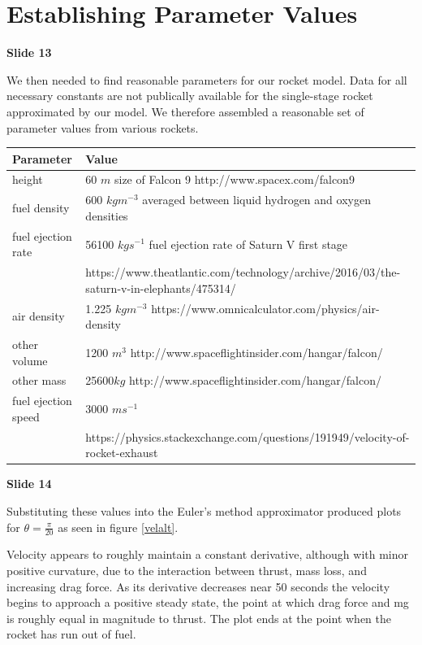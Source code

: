 \documentclass[]{article}
\begin{document}
\section{Establishing Parameter Values}

\textbf{Slide 13}

We then needed to find reasonable parameters for our rocket model. Data for all necessary constants are not publically available for the single-stage rocket approximated by our model. We therefore assembled a reasonable set of parameter values from various rockets. 

\begin{center}
	\begin{tabular} {l l} 
		Parameter & Value \\
		\hline
		height & 60 $m$ size of Falcon 9 http://www.spacex.com/falcon9\\
		fuel density & 600 $kgm^{-3}$ averaged between liquid hydrogen and oxygen densities\\
		fuel ejection rate & 56100 $kg s^{-1}$ fuel ejection rate of Saturn V first stage \\ & \small https://www.theatlantic.com/technology/archive/2016/03/the-saturn-v-in-elephants/475314/ \normalsize\\
		air density & 1.225 $kg m^{-3}$ https://www.omnicalculator.com/physics/air-density\\
		other volume & 1200 $m^3$ http://www.spaceflightinsider.com/hangar/falcon/\\
		other mass  & 25600$kg$  http://www.spaceflightinsider.com/hangar/falcon/ \\
		fuel ejection speed & 3000 $ms^{-1}$ \\ &https://physics.stackexchange.com/questions/191949/velocity-of-rocket-exhaust
	\end{tabular}
\end{center}
	
	
\textbf{Slide 14}

Substituting these values into the Euler's method approximator produced plots for $\theta = \frac{\pi}{20}$ as seen in figure \ref{velalt}.

Velocity appears to roughly maintain a constant derivative, although with minor positive curvature, due to the interaction between thrust, mass loss, and increasing drag force. As its derivative decreases near 50 seconds the velocity begins to approach a positive steady state, the point at which drag force and mg is roughly equal in magnitude to thrust. The plot ends at the point when the rocket has run out of fuel.
\end{document}
